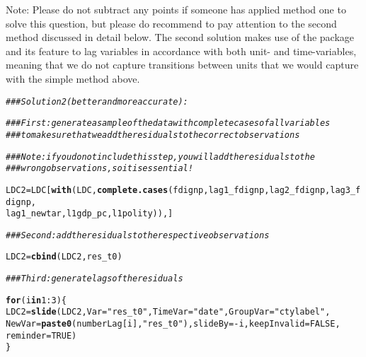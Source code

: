\documentclass[12pt]{article}\usepackage[]{graphicx}\usepackage[]{color}
\makeatletter
\newcommand{\hlnum}[1]{\textcolor[rgb]{0.686,0.059,0.569}{#1}}%
\newcommand{\hlstr}[1]{\textcolor[rgb]{0.192,0.494,0.8}{#1}}%
\newcommand{\hlcom}[1]{\textcolor[rgb]{0.678,0.584,0.686}{\textit{#1}}}%
\newcommand{\hlopt}[1]{\textcolor[rgb]{0,0,0}{#1}}%
\newcommand{\hlstd}[1]{\textcolor[rgb]{0.345,0.345,0.345}{#1}}%
\newcommand{\hlkwa}[1]{\textcolor[rgb]{0.161,0.373,0.58}{\textbf{#1}}}%
\newcommand{\hlkwb}[1]{\textcolor[rgb]{0.69,0.353,0.396}{#1}}%
\newcommand{\hlkwc}[1]{\textcolor[rgb]{0.333,0.667,0.333}{#1}}%
\newcommand{\hlkwd}[1]{\textcolor[rgb]{0.737,0.353,0.396}{\textbf{#1}}}%
\newenvironment{kframe}{%
 \def\at@end@of@kframe{}%
 \ifinner\ifhmode%
  \def\at@end@of@kframe{\end{minipage}}%
  \begin{minipage}{\columnwidth}%
 \fi\fi%
 \def\FrameCommand##1{\hskip\@totalleftmargin \hskip-\fboxsep
 \colorbox{shadecolor}{##1}\hskip-\fboxsep
     \hskip-\linewidth \hskip-\@totalleftmargin \hskip\columnwidth}%
 \MakeFramed {\advance\hsize-\width
   \@totalleftmargin\z@ \linewidth\hsize
   \@setminipage}}%
 {\par\unskip\endMakeFramed%
 \at@end@of@kframe}
\newenvironment{knitrout}{}{} %
\makeatother
\begin{document}
Note: Please do not subtract any points if someone has applied method one to solve this question, but please do recommend to pay attention to the second method discussed in detail below. The second solution makes use of the  package and its feature to lag variables in accordance with both unit- and time-variables, meaning that we do not capture transitions between units that we would capture with the simple method above.

\begin{knitrout}
\color{fgcolor}\begin{kframe}
\begin{alltt}
\hlcom{### Solution 2 (better and more accurate):}

\hlcom{### First: generate a sample of the data with complete cases of all variables}
\hlcom{### to make sure that we add the residuals to the correct observations}

\hlcom{### Note: if you do not include this step, you will add the residuals to the}
\hlcom{### wrong observations, so it is essential!}

\hlstd{LDC2} \hlkwb{=} \hlstd{LDC[}\hlkwd{with}\hlstd{(LDC,} \hlkwd{complete.cases}\hlstd{(fdignp, lag1_fdignp, lag2_fdignp, lag3_fdignp,}
    \hlstd{lag1_newtar, l1gdp_pc, l1polity)), ]}

\hlcom{### Second: add the residuals to the respective observations}

\hlstd{LDC2} \hlkwb{=} \hlkwd{cbind}\hlstd{(LDC2, res_t0)}

\hlcom{### Third: generate lags of the residuals}

\hlkwa{for} \hlstd{(i} \hlkwa{in} \hlnum{1}\hlopt{:}\hlnum{3}\hlstd{) \{}
    \hlstd{LDC2} \hlkwb{=} \hlkwd{slide}\hlstd{(LDC2,} \hlkwc{Var} \hlstd{=} \hlstr{"res_t0"}\hlstd{,} \hlkwc{TimeVar} \hlstd{=} \hlstr{"date"}\hlstd{,} \hlkwc{GroupVar} \hlstd{=} \hlstr{"ctylabel"}\hlstd{,}
        \hlkwc{NewVar} \hlstd{=} \hlkwd{paste0}\hlstd{(numberLag[i],} \hlstr{"res_t0"}\hlstd{),} \hlkwc{slideBy} \hlstd{=} \hlopt{-}\hlstd{i,} \hlkwc{keepInvalid} \hlstd{=} \hlnum{FALSE}\hlstd{,}
        \hlkwc{reminder} \hlstd{=} \hlnum{TRUE}\hlstd{)}
\hlstd{\}}
\end{alltt}



\end{kframe}
\end{knitrout}
\end{document}
